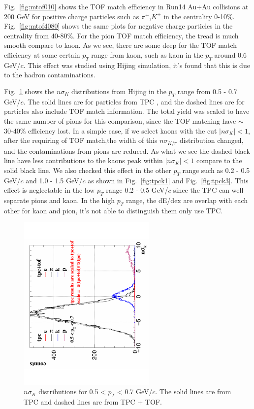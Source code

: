 Fig.~\ref{fig:mtof010} shows the TOF match efficiency in Run14 Au+Au collisions at 200 GeV for positive charge particles such as $\pi^{+}$,$K^{+}$ in the centrality 0-10\%. Fig.~\ref{fig:mtof4080} shows the same plots for negative charge particles in the centrality from 40-80\%. For the pion TOF match efficiency, the tread is much smooth compare to kaon. As we see, there are some deep for the TOF match efficiency at some certain $p_{T}$ range from kaon, such as kaon in the $p_{T}$ around 0.6 GeV/$c$. This effect was studied using Hijing simulation, it's found that this is due to the hadron contaminations. 

Fig.~\ref{fig:tpck2} shows the $n\sigma_{K}$ distributions from Hijing in the $p_{T}$ range from 0.5 - 0.7 GeV/$c$. The solid lines are for particles from TPC , and the dashed lines are for particles also include TOF match information. The total yield was scaled to have the same number of pions for this comparison, since the TOF matching have $\sim$30-40\% efficiency lost. In a simple case, if we select kaons with the cut $|n\sigma_{K}| < 1 $, after the requiring of TOF match,the width of this $n\sigma_{K/\pi}$ distribution changed, and the contaminations from pions are reduced. As what we see the dashed black line have less contributions to the kaons peak within $|n\sigma_{K}| < 1$ compare to the solid black line. We also checked this effect in the other $p_{T}$ range such as 0.2 - 0.5 GeV/$c$ and 1.0 - 1.5 GeV/$c$ as shown in Fig.~\ref{fig:tpck1} and Fig.~\ref{fig:tpck3}. This effect is neglectable in the low $p_{T}$ range 0.2 - 0.5 GeV/$c$ since the TPC can well separate pions and kaon. In the high $p_{T}$ range, the dE/dex are overlap with each other for kaon and pion, it's not able to distinguish them only use TPC.

\begin{figure}[htbp]
\centering
\includegraphics[keepaspectratio,width=0.6\textwidth,angle=-90]{figure/Run14_D0HFT/tofMatch_Hijing_nSigmaK.pdf}
\caption{$n\sigma_{K}$ distributions for 0.5 < $p_T$ < 0.7 GeV/$c$. The solid lines are from TPC and dashed lines are from TPC + TOF.}
\label{fig:tpck2}
\end{figure}

